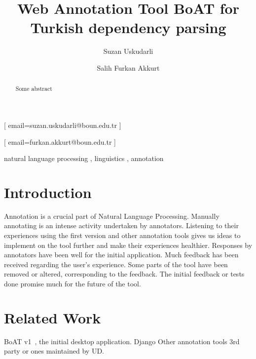 \documentclass[
]{ceurart}
\begin{document}


\title{Web Annotation Tool BoAT for Turkish dependency parsing}

\author[1]{Suzan Uskudarli}[%
email=suzan.uskudarli@boun.edu.tr
]

\author[1]{Salih Furkan Akkurt}[%
email=furkan.akkurt@boun.edu.tr
]

\address[1]{ Department of Computer Engineering, Bogazici University, Bebek, 34342, İstanbul, Turkey }

\begin{abstract}
Some abstract
\end{abstract}

\begin{keywords}
natural language processing \sep
linguistics \sep
annotation
\end{keywords}

\maketitle

\section{Introduction}

Annotation is a crucial part of Natural Language Processing. Manually annotating is an intense activity undertaken by annotators. Listening to their experiences using the first version and other annotation tools gives us ideas to implement on the tool further and make their experiences healthier.
Responses by annotators have been well for the initial application. Much feedback has been received regarding the user's experience. Some parts of the tool have been removed or altered, corresponding to the feedback. The initial feedback or tests done promise much for the future of the tool.

\section{Related Work}

BoAT v1~\cite{turk-etal-2019-turkish}, the initial desktop application.
Django\cite{django}
Other annotation tools 3rd party or ones maintained by UD.
\end{document}
